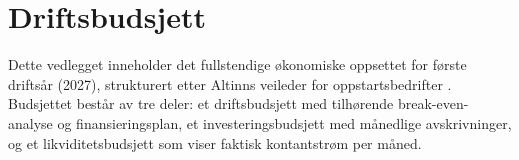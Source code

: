 \section{Driftsbudsjett}
\label{app:driftsbudsjett}

Dette vedlegget inneholder det fullstendige økonomiske oppsettet for første driftsår (2027), strukturert etter Altinns veileder for oppstartsbedrifter \parencite{altinn_budsjett}. Budsjettet består av tre deler: et driftsbudsjett med tilhørende break-even-analyse og finansieringsplan, et investeringsbudsjett med månedlige avskrivninger, og et likviditetsbudsjett som viser faktisk kontantstrøm per måned.





